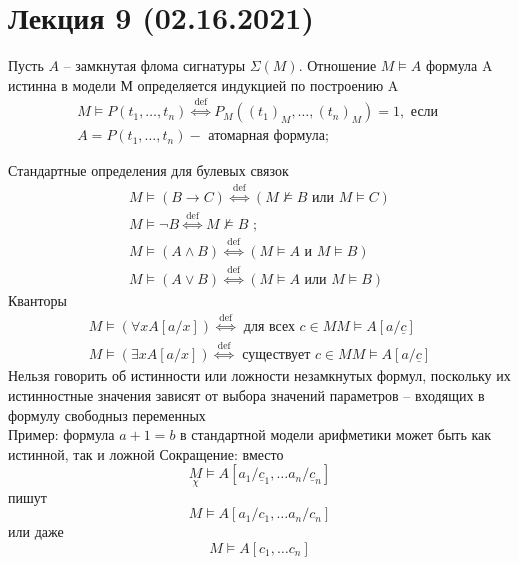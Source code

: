 \section{Лекция 9 (02.16.2021)}

\begin{defn}
Пусть $A$ -- замкнутая флома сигнатуры $\Sigma(M)$. Отношение $M \vDash  A$ формула A истинна в модели М определяется индукцией по построению A
$$
\begin{array}{l}
M \vDash P\left(t_{1}, \ldots, t_{n}\right) \stackrel{\text { def }}{\Longleftrightarrow} P_{M}\left(\left(t_{1}\right)_{M}, \ldots,\left(t_{n}\right)_{M}\right)=1, \text { если } \\
A=P\left(t_{1}, \ldots, t_{n}\right)-\text { атомарная формула; }
\end{array}
$$
\end{defn}
\vskip 0.2in
Стандартные определения для булевых связок
$$
\begin{array}{l}
M \vDash(B \rightarrow C) \stackrel{\text { def }}{\Longleftrightarrow}(M \not \models B \text { или } M \vDash C)\\
M \vDash \neg B \stackrel{\text { def }}{\Longleftrightarrow} M \not \models B \text { ; }\\
M \vDash(A \wedge B) \stackrel{\text { def }}{\Longleftrightarrow}(M \vDash A \text { и } M \vDash B)\\
M \vDash(A \vee B) \stackrel{\text { def }}{\Longleftrightarrow}(M \vDash A \text { или } M \vDash B)
\end{array}
$$
\vskip 0.2in
Кванторы
$$
\begin{array}{l}
M \vDash(\forall x A[a / x]) \stackrel{\text { def }}{\Longleftrightarrow} \text { для всех } c \in M M \vDash A[a / \underline{c}] \\
M \vDash(\exists x A[a / x]) \stackrel{\text { def }}{\Longleftrightarrow} \text { существует } c \in M M \vDash A[a / \underline{c}]
\end{array}
$$
\vskip 0.2in
Нельзя говорить об истинности или ложности незамкнутых формул, поскольку их истинностные значения зависят от выбора значений параметров -- входящих в формулу свободныз переменных\\
Пример: формула $a+1=b$ в стандартной модели арифметики может быть как истинной, так и ложной
\vskip 0.1in
Сокращение: вместо
$$
\underset{\chi}{M} \vDash A\left[a_{1} / \underline{c}_{1}, \ldots a_{n} / \underline{c}_{n}\right]
$$
пишут
$$
M \models A\left[a_{1} / c_{1}, \ldots a_{n} / c_{n}\right]
$$
или даже
$$
M \models A\left[c_{1}, \ldots c_{n}\right]
$$
